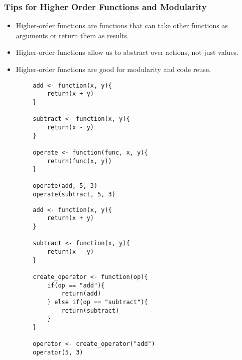 \documentclass[serif, 9pt, aspectratio=32]{beamer}
\begin{document}
\begin{frame}
    \centering
    \frametitle{Tips for Higher Order Functions and Modularity}
    \begin{itemize}
        \setlength{\itemsep}{2em}
        \item Higher-order functions are functions that can take other functions as arguments or return them as results.
        \item Higher-order functions allow us to abstract over actions, not just values.
        \item Higher-order functions are good for modularity and code reuse.
    \end{itemize}
\end{frame}

\begin{frame}[fragile]
    \begin{lstlisting}
        add <- function(x, y){
            return(x + y)
        }

        subtract <- function(x, y){
            return(x - y)
        }

        operate <- function(func, x, y){
            return(func(x, y))
        }

        operate(add, 5, 3)
        operate(subtract, 5, 3)
    \end{lstlisting}
\end{frame}

\begin{frame}[fragile]
    \begin{lstlisting}
        add <- function(x, y){
            return(x + y)
        }

        subtract <- function(x, y){
            return(x - y)
        }

        create_operator <- function(op){
            if(op == "add"){
                return(add)
            } else if(op == "subtract"){
                return(subtract)
            }
        }

        operator <- create_operator("add")
        operator(5, 3)
    \end{lstlisting}
\end{frame}
\end{document}
